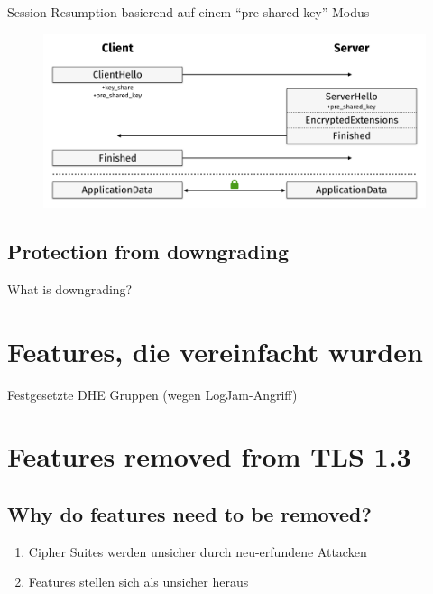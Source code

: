 \documentclass{f4_beamer_metropolis}
\begin{document}
\begin{frame}{Session Resumption basierend auf einem \enquote{pre-shared key}-Modus}
  \begin{figure}[!h]
    \centering
    \vspace*{-0.25cm}
    \includegraphics[width=\linewidth]{./images/tls13-handshake-resumption.png}
    \label{fig:tls13-handshake-resumption}
  \end{figure}
\end{frame}

\subsection{Protection from downgrading}

\begin{frame}{What is downgrading?}

\end{frame}

\section{Features, die vereinfacht wurden}

\begin{frame}{}
Festgesetzte DHE Gruppen (wegen LogJam-Angriff)
\end{frame}

\section{Features removed from TLS 1.3}

\subsection{Why do features need to be removed?}

\begin{frame}
  \begin{enumerate}[<+->]
    \item Cipher Suites werden unsicher durch neu-erfundene Attacken
    \item Features stellen sich als unsicher heraus
    \end{enumerate}
\end{frame}
\end{document}

